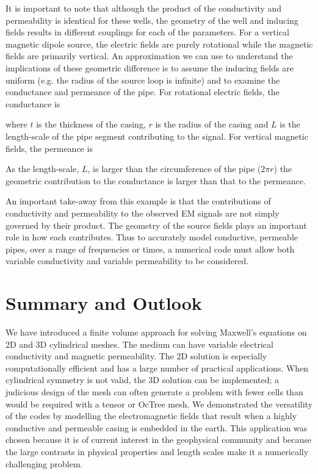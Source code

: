 





It is important to note that although the product of the conductivity and permeability is identical for these wells, the geometry of the well and inducing fields results in different couplings for each of the parameters. For a vertical magnetic dipole source, the electric fields are purely rotational while the magnetic fields are primarily vertical. An approximation we can use to understand the implications of these geometric difference is to assume the inducing fields are uniform (e.g. the radius of the source loop is infinite) and to examine the conductance and permeance of the pipe. For rotational electric fields, the conductance is

where $t$ is the thickness of the casing, $r$ is the radius of the casing and $L$ is the length-scale of the pipe segment contributing to the signal. For vertical magnetic fields, the permeance is

As the length-scale, $L$, is larger than the circumference of the pipe ($2\pi r$) the geometric contribution to the conductance is larger than that to the permeance.

An important take-away from this example is that the contributions of conductivity and permeability to the observed EM signals are not simply governed by their product. The geometry of the source fields plays an important role in how each contributes. Thus to accurately model conductive, permeable pipes, over a range of frequencies or times, a numerical code must allow both variable conductivity and variable permeability to be considered.





\section{Summary and Outlook}

We have introduced a finite volume approach for solving Maxwell’s equations on 2D and 3D cylindrical meshes. The medium can have variable electrical conductivity and magnetic permeability. The 2D solution is especially computationally efficient and has a large number of practical applications. When cylindrical symmetry is not valid, the 3D solution can be implemented; a judicious design of the mesh can often generate a problem with fewer cells than would be required with a tensor or OcTree mesh. We demonstrated the versatility of the codes by modelling the electromagnetic fields that result when a highly conductive and permeable casing is embedded in the earth. This application was chosen because it is of current interest in the geophysical community and because the large contrasts in physical properties and length scales make it a numerically challenging problem.

